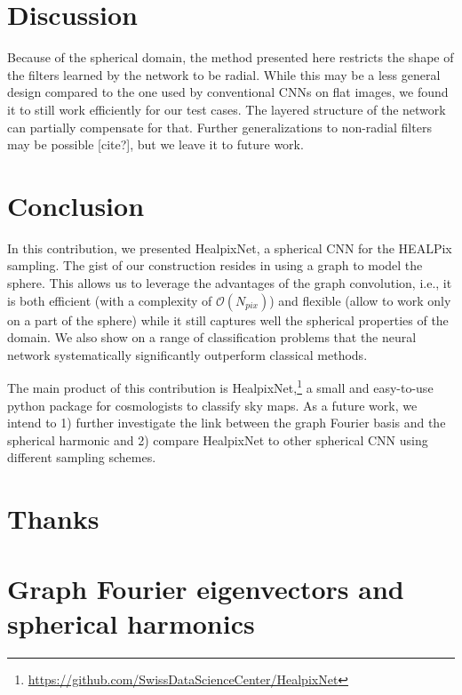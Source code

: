 \documentclass[final,twocolumn,3p,times,authoryear]{elsarticle}
\newcommand{\nati}[1]{{\color[rgb]{.1,.6,.1}{#1}}}
\newcommand{\1}{\b{1}}              %
\newcommand{\0}{\b{0}}              %
\begin{document}
\section{Discussion}

Because of the spherical domain, the method presented here restricts the shape of the filters learned by the network to be radial.
While this may be a less general design compared to the one used by conventional CNNs on flat images, we found it to still work efficiently for our test cases.
The layered structure of the network can partially compensate for that.
Further generalizations to non-radial filters may be possible [cite?], but we leave it to future work.

\nati{Should the discussion be merged with the result section?}

\section{Conclusion}
\label{sec:conclusion}

In this contribution, we presented HealpixNet, a spherical CNN for the HEALPix sampling. The gist of our construction resides in using a graph to model the sphere.
This allows us to leverage the advantages of the graph convolution, i.e., it is both efficient (with a complexity of $\mathcal{O}(N_{pix})$) and flexible (allow to work only on a part of the sphere) while it still captures well the spherical properties of the domain.
We also show on a range of classification problems that the neural network systematically significantly outperform classical methods.

The main product of this contribution is HealpixNet,\footnote{\url{https://github.com/SwissDataScienceCenter/HealpixNet}} a small and easy-to-use python package for cosmologists to classify sky maps.
As a future work, we intend to 1) further investigate the link between the graph Fourier basis and the spherical harmonic and 2) compare HealpixNet to other spherical CNN using different sampling schemes.

\section*{Thanks}

\appendix

\section{Graph Fourier eigenvectors and spherical harmonics}
\label{sec:spherical_harmonics}
\end{document}
